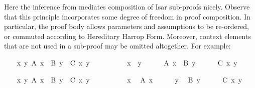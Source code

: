\begin{isabellebody}
%
\endisatagproof
{\isafoldproof}%
%
\isadelimproof
%
\endisadelimproof
%
\endgroup
%
\begin{isamarkuptext}%
\noindent Here the \hyperlink{inference.refinement}{\mbox{}} inference from
   mediates composition of Isar
  sub-proofs nicely.  Observe that this principle incorporates some
  degree of freedom in proof composition.  In particular, the proof
  body allows parameters and assumptions to be re-ordered, or commuted
  according to Hereditary Harrop Form.  Moreover, context elements
  that are not used in a sub-proof may be omitted altogether.  For
  example:%
\end{isamarkuptext}%
\isamarkuptrue%
%
\begin{minipage}{0.5\textwidth}
%
\isadelimproof
\ \ %
\endisadelimproof
%
\isatagproof
{}\isamarkupfalse%
\ {\isachardoublequoteopen}{\isasymAnd}x\ y{\isachardot}\ A\ x\ {\isasymLongrightarrow}\ B\ y\ {\isasymLongrightarrow}\ C\ x\ y{\isachardoublequoteclose}\isanewline
\ \ \isamarkupfalse%
\ {\isacharminus}\isanewline
\ \ \ \ \isamarkupfalse%
\ x\ \ y\isanewline
\ \ \ \ \isamarkupfalse%
\ {\isachardoublequoteopen}A\ x{\isachardoublequoteclose}\ \ {\isachardoublequoteopen}B\ y{\isachardoublequoteclose}\isanewline
\ \ \ \ \isamarkupfalse%
\ {\isachardoublequoteopen}C\ x\ y{\isachardoublequoteclose}%
\endisatagproof
{\isafoldproof}%
%
\isadelimproof
%
\endisadelimproof
%
\isadelimnoproof
\ %
\endisadelimnoproof
%
\isatagnoproof
{}\isamarkupfalse%
%
\endisatagnoproof
{\isafoldnoproof}%
%
\isadelimnoproof
%
\endisadelimnoproof
\isanewline
%
\isadelimproof
\ \ %
\endisadelimproof
%
\isatagproof
{}\isamarkupfalse%
%
\end{minipage}\begin{minipage}{0.5\textwidth}
\ \ \isamarkupfalse%
\ {\isachardoublequoteopen}{\isasymAnd}x\ y{\isachardot}\ A\ x\ {\isasymLongrightarrow}\ B\ y\ {\isasymLongrightarrow}\ C\ x\ y{\isachardoublequoteclose}\isanewline
\ \ \isamarkupfalse%
\ {\isacharminus}\isanewline
\ \ \ \ \isamarkupfalse%
\ x\ \isamarkupfalse%
\ {\isachardoublequoteopen}A\ x{\isachardoublequoteclose}\isanewline
\ \ \ \ \isamarkupfalse%
\ y\ \isamarkupfalse%
\ {\isachardoublequoteopen}B\ y{\isachardoublequoteclose}\isanewline
\ \ \ \ \isamarkupfalse%
\ {\isachardoublequoteopen}C\ x\ y{\isachardoublequoteclose}%

\end{minipage}
\end{isabellebody}
